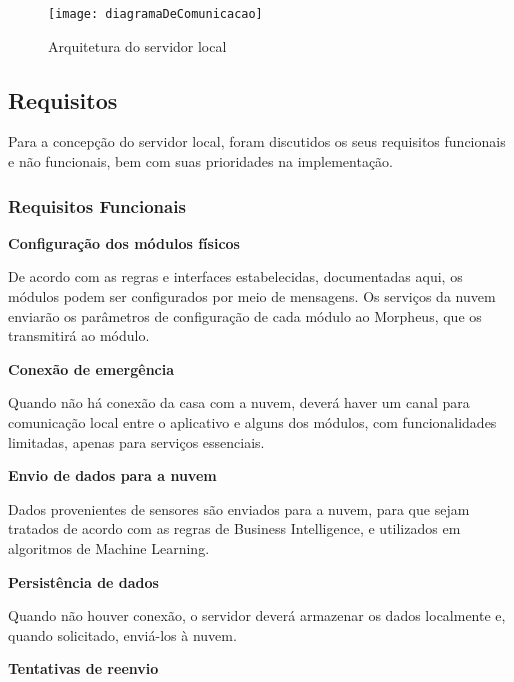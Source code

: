 \begin{figure}
	\centering
	\caption{Arquitetura do servidor local}
  \texttt{[image: diagramaDeComunicacao]}
\label{fig:diagramaDeComunicacao}
\end{figure}

\subsection{Requisitos}
Para a concepção do servidor local, foram discutidos os seus requisitos funcionais e não funcionais, bem com suas prioridades na implementação.

\subsubsection{Requisitos Funcionais}
\begin{description}

\item \textbf{Configuração dos módulos físicos}

De acordo com as regras e interfaces estabelecidas, documentadas aqui, os módulos podem ser configurados por meio de mensagens. Os serviços da nuvem enviarão os parâmetros de configuração de cada módulo ao Morpheus, que os transmitirá ao módulo.

\item \textbf{Conexão de emergência}

Quando não há conexão da casa com a nuvem, deverá haver um canal para comunicação local entre o aplicativo e alguns dos módulos, com funcionalidades limitadas, apenas para serviços essenciais.

\item \textbf{Envio de dados para a nuvem}

Dados provenientes de sensores são enviados para a nuvem, para que sejam tratados de acordo com as regras de Business Intelligence, e utilizados em algoritmos de Machine Learning.

\item \textbf{Persistência de dados}

Quando não houver conexão, o servidor deverá armazenar os dados localmente e, quando solicitado, enviá-los à nuvem.

\item \textbf{Tentativas de reenvio}


\end{description}
